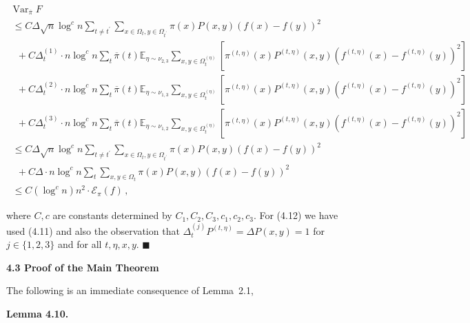 \[\begin{gathered}
\displaystyle\operatorname{Var}_{\overline{\pi}}F \\
\displaystyle~\leq C\Delta\sqrt{n}\log^{c}n\sum_{t\neq t^{\prime}}\sum_{x\in\Omega_{t},y\in\Omega_{t^{\prime}}}\pi(x)P(x,y)(f(x)-f(y))^{2} \\
\displaystyle~~~+C\Delta_{t}^{(1)}\cdot n\log^{c}n\sum_{t}\overline{\pi}(t)\mathbb{E}_{\eta\sim\nu_{2,3}}\sum_{x,y\in\Omega_{t}^{(\eta)}}\left[\pi^{(t,\eta)}(x)P^{(t,\eta)}(x,y)(f^{(t,\eta)}(x)-f^{(t,\eta)}(y))^{2}\right] \\
\displaystyle~~~+C\Delta_{t}^{(2)}\cdot n\log^{c}n\sum_{t}\overline{\pi}(t)\mathbb{E}_{\eta\sim\nu_{1,3}}\sum_{x,y\in\Omega_{t}^{(\eta)}}\left[\pi^{(t,\eta)}(x)P^{(t,\eta)}(x,y)(f^{(t,\eta)}(x)-f^{(t,\eta)}(y))^{2}\right] \\
\displaystyle~~~+C\Delta_{t}^{(3)}\cdot n\log^{c}n\sum_{t}\overline{\pi}(t)\mathbb{E}_{\eta\sim\nu_{1,2}}\sum_{x,y\in\Omega_{t}^{(\eta)}}\left[\pi^{(t,\eta)}(x)P^{(t,\eta)}(x,y)(f^{(t,\eta)}(x)-f^{(t,\eta)}(y))^{2}\right] \\
\displaystyle~\leq C\Delta\sqrt{n}\log^{c}n\sum_{t\neq t^{\prime}}\sum_{x\in\Omega_{t},y\in\Omega_{t^{\prime}}}\pi(x)P(x,y)(f(x)-f(y))^{2} \\
\displaystyle~~~+C\Delta\cdot n\log^{c}n\sum_{t}\sum_{x,y\in\Omega_{t}}\pi(x)P(x,y)(f(x)-f(y))^{2} \\
\displaystyle~\leq C(\log^{c}n)n^{2}\cdot\mathcal{E}_{\pi}(f)\,,
\end{gathered}\]


where $C,c$ are constants determined by $C_{1},C_{2},C_{3},c_{1},c_{2},c_{3}$. For (4.12) we have used (4.11) and also the observation that $\Delta_{t}^{(j)}P^{(t,\eta)}=\Delta P(x,y)=1$ for $j\in\{1,2,3\}$ and for all $t,\eta,x,y$.
\ensuremath{\blacksquare}\par






\par\medskip\noindent\textbf{4.3 Proof of the Main Theorem}\par




The following is an immediate consequence of Lemma 2.1,\par





\par\medskip\noindent\textbf{\textbf{Lemma 4.10}\textbf{.}}\par



